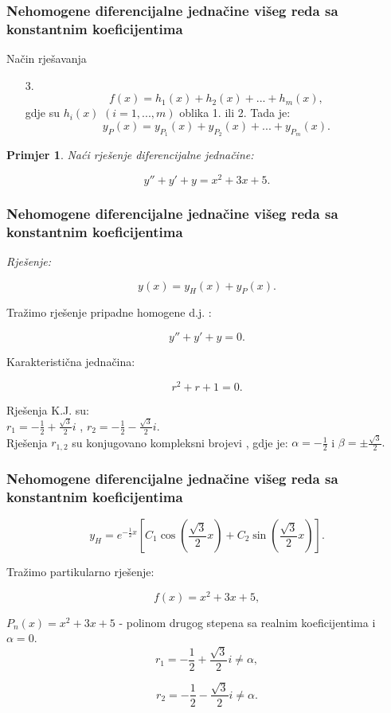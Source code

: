 \documentclass{beamer}
\newtheorem{pri}{\textrm{Primjer}}[section]
\begin{document}
         \begin{frame}
\frametitle{Nehomogene diferencijalne jednačine višeg reda sa konstantnim koeficijentima} 
\begin{alertblock}{Način rješavanja}
\begin{enumerate}
       
            \item[3.]  $$f(x) = h_{1}(x) + h_{2}(x) + ... +h_{m}(x) , $$ gdje su $h_{i}(x)$ $(i=1,...,m)$ oblika 1. ili 2. Tada je:
            $$y_P(x) = y_{P_{1}}(x) + y_{P_{2}}(x) +...+  y_{P_{m}}(x).$$
        \end{enumerate}
\end{alertblock}

\begin{pri}
Naći rješenje diferencijalne jednačine:

$$y'' + y' + y = x^2 + 3x +5.$$
\end{pri}

\end{frame}
  \begin{frame}
\frametitle{Nehomogene diferencijalne jednačine višeg reda sa konstantnim koeficijentima} 
\emph{Rješenje: }

$$y(x) = y_{H}(x) + y_{P} (x).$$ 

Tražimo rješenje pripadne homogene d.j. :

$$y'' + y' + y = 0. $$

Karakteristična jednačina:

$$r^{2} + r +1 = 0.$$

Rješenja K.J. su:\\

$r_{1} = -\frac{1}{2} +\frac{\sqrt{3}}{2}i $ , $ r_{2} = -\frac{1}{2} -\frac{\sqrt{3}}{2}i.$ \\

Rješenja $r_{1,2}$ su konjugovano kompleksni brojevi , gdje je:
$\alpha = -\frac{1}{2} $ i $ \beta = \pm \frac{\sqrt{3}}{2}. $

\end{frame}
\begin{frame}
\frametitle{Nehomogene diferencijalne jednačine višeg reda sa konstantnim koeficijentima} 

$$y_{H} = e^{-\frac{1}{2}x}\left[C_{1}\cos{\left(\frac{\sqrt{3}}{2} x \right) } + C_{2}\sin{\left(\frac{\sqrt{3}}{2} x\right)}\right].$$

Tražimo partikularno rješenje:

$$f(x) = x^2 + 3x +5, $$

$P_{n}(x)= x^2 + 3x +5 $ - polinom drugog stepena sa realnim koeficijentima i $\alpha = 0.$ \\

$$r_{1} = -\frac{1}{2} +\frac{\sqrt{3}}{2}i \ne \alpha, $$ 

 $$ r_{2} = -\frac{1}{2} -\frac{\sqrt{3}}{2}i \ne \alpha.$$
 
\end{frame}
\end{document}
